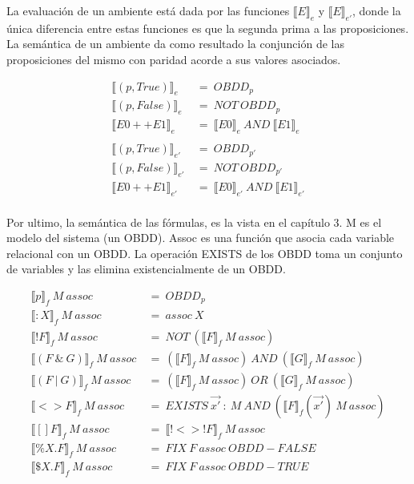 \noindent La evaluación de un ambiente está dada por las funciones $\llbracket E \rrbracket _{e}$ y $\llbracket E \rrbracket _{e'}$, donde la única diferencia entre estas funciones es que la segunda prima a las proposiciones. La semántica de un ambiente da como resultado la conjunción de las proposiciones del mismo con paridad acorde a sus valores asociados.

\begin{align*}
\llbracket (p,True) \rrbracket _{e}\ &=\ OBDD_{p} \\
\llbracket (p,False) \rrbracket _{e}\ &=\ NOT\ OBDD_{p} \\
\llbracket E0++E1 \rrbracket _{e}\ &=\ \llbracket E0 \rrbracket _{e}\ AND\ \llbracket E1 \rrbracket _{e} \\
\\
\llbracket (p,True) \rrbracket _{e'}\ &=\ OBDD_{p'} \\
\llbracket (p,False) \rrbracket _{e'}\ &=\ NOT\ OBDD_{p'} \\
\llbracket E0++E1 \rrbracket _{e'}\ &=\ \llbracket E0 \rrbracket _{e'}\ AND\ \llbracket E1 \rrbracket _{e'} \\
\end{align*}

\noindent Por ultimo, la semántica de las fórmulas, es la vista en el capítulo 3. M es el modelo del sistema (un OBDD). Assoc es una función que asocia cada variable relacional con un OBDD. La operación EXISTS de los OBDD toma un conjunto de variables y las elimina existencialmente de un OBDD.

\begin{align*}
\llbracket p \rrbracket _{f}\ M\ assoc\ &=\ OBDD_{p} \\
\llbracket :X \rrbracket _{f}\ M\ assoc\ &=\ assoc\ X \\
\llbracket !F \rrbracket _{f}\ M\ assoc\ &=\ NOT\ (\llbracket F \rrbracket _{f}\ M\ assoc)\\
\llbracket (F\ \&\ G) \rrbracket _{f}\ M\ assoc\ &=\ (\llbracket F \rrbracket _{f}\ M\ assoc)\ AND\ (\llbracket G \rrbracket _{f}\ M\ assoc)\\
\llbracket (F\ |\ G) \rrbracket _{f}\ M\ assoc\ &=\ (\llbracket F \rrbracket _{f}\ M\ assoc)\ OR\ (\llbracket G \rrbracket _{f}\ M\ assoc)\\
\llbracket <>F \rrbracket _{f}\ M\ assoc\ &=\ EXISTS\ \vec {x'}\ :\ M\ AND\ (\llbracket F \rrbracket _{f}(\vec {x'})\ M\ assoc) \\
\llbracket []F \rrbracket _{f}\ M\ assoc\ &=\ \llbracket !<>!F \rrbracket _{f}\ M\ assoc \\
\llbracket \%X.F \rrbracket _{f}\ M\ assoc\ &=\ FIX\ F\ assoc\ OBDD-FALSE \\
\llbracket \$X.F \rrbracket _{f}\ M\ assoc\ &=\ FIX\ F\ assoc\ OBDD-TRUE \\
\end{align*}

